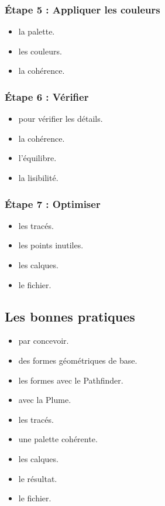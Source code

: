 \subsubsection{Étape 5 : Appliquer les couleurs}

\begin{itemize}
    \item {} la palette.
    \item {} les couleurs.
    \item {} la cohérence.
\end{itemize}

\subsubsection{Étape 6 : Vérifier}

\begin{itemize}
    \item {} pour vérifier les détails.
    \item {} la cohérence.
    \item {} l'équilibre.
    \item {} la lisibilité.
\end{itemize}

\subsubsection{Étape 7 : Optimiser}

\begin{itemize}
    \item {} les tracés.
    \item {} les points inutiles.
    \item {} les calques.
    \item {} le fichier.
\end{itemize}

\subsection{Les bonnes pratiques}

\begin{itemize}
    \item {} par concevoir.
    \item {} des formes géométriques de base.
    \item {} les formes avec le Pathfinder.
    \item {} avec la Plume.
    \item {} les tracés.
    \item {} une palette cohérente.
    \item {} les calques.
    \item {} le résultat.
    \item {} le fichier.
\end{itemize}

